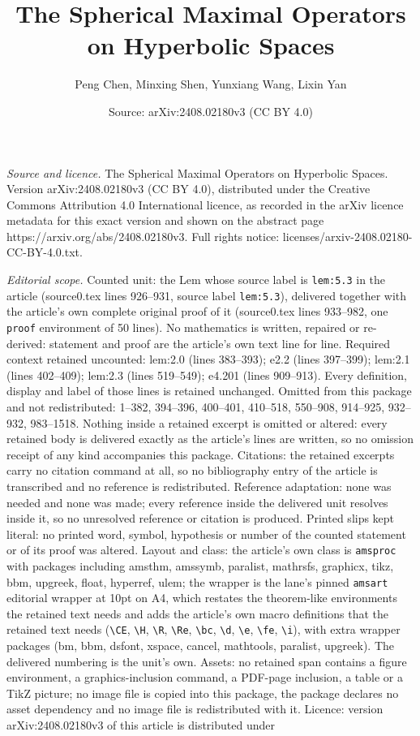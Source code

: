 \documentclass[10pt,a4paper]{amsart}
\title[The Spherical Maximal Operators on Hyperbolic Spaces]{The Spherical Maximal Operators on Hyperbolic Spaces}
\author{Peng Chen, Minxing Shen, Yunxiang Wang, Lixin Yan}
\date{Source: arXiv:2408.02180v3 (CC BY 4.0)}
\begin{document}
\maketitle

\noindent\emph{Source and licence.} The Spherical Maximal Operators on Hyperbolic Spaces. Version arXiv:2408.02180v3 (CC BY 4.0), distributed under the Creative Commons Attribution 4.0 International licence, as recorded in the arXiv licence metadata for this exact version and shown on the abstract page https://arxiv.org/abs/2408.02180v3. Full rights notice: licenses/arxiv-2408.02180-CC-BY-4.0.txt.\par\smallskip

\noindent\textit{Editorial scope.} Counted unit: the Lem whose source label is \texttt{lem:5.3} in the article (source0.tex lines 926--931, source label \texttt{lem:5.3}), delivered together with the article's own complete original proof of it (source0.tex lines 933--982, one \texttt{proof} environment of 50 lines). No mathematics is written, repaired or re-derived: statement and proof are the article's own text line for line. Required context retained uncounted: lem:2.0 (lines 383--393); e2.2 (lines 397--399); lem:2.1 (lines 402--409); lem:2.3 (lines 519--549); e4.201 (lines 909--913). Every definition, display and label of those lines is retained unchanged. Omitted from this package and not redistributed: 1--382, 394--396, 400--401, 410--518, 550--908, 914--925, 932--932, 983--1518. Nothing inside a retained excerpt is omitted or altered: every retained body is delivered exactly as the article's lines are written, so no omission receipt of any kind accompanies this package. Citations: the retained excerpts carry no citation command at all, so no bibliography entry of the article is transcribed and no reference is redistributed. Reference adaptation: none was needed and none was made; every reference inside the delivered unit resolves inside it, so no unresolved reference or citation is produced. Printed slips kept literal: no printed word, symbol, hypothesis or number of the counted statement or of its proof was altered. Layout and class: the article's own class is \texttt{amsproc} with packages including amsthm, amssymb, paralist, mathrsfs, graphicx, tikz, bbm, upgreek, float, hyperref, ulem; the wrapper is the lane's pinned \texttt{amsart} editorial wrapper at 10pt on A4, which restates the theorem-like environments the retained text needs and adds the article's own macro definitions that the retained text needs (\texttt{\textbackslash CE}, \texttt{\textbackslash H}, \texttt{\textbackslash R}, \texttt{\textbackslash Re}, \texttt{\textbackslash bc}, \texttt{\textbackslash d}, \texttt{\textbackslash e}, \texttt{\textbackslash fe}, \texttt{\textbackslash i}), with extra wrapper packages (bm, bbm, dsfont, xspace, cancel, mathtools, paralist, upgreek). The delivered numbering is the unit's own. Assets: no retained span contains a figure environment, a graphics-inclusion command, a PDF-page inclusion, a table or a TikZ picture; no image file is copied into this package, the package declares no asset dependency and no image file is redistributed with it. Licence: version arXiv:2408.02180v3 of this article is distributed under 
\end{document}
